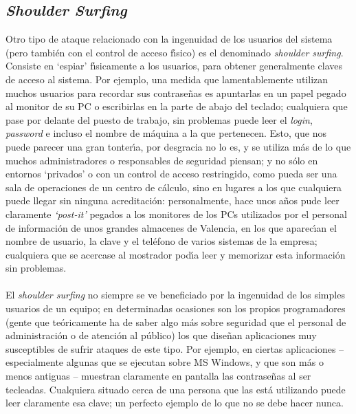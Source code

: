 \subsection{{\it Shoulder Surfing}} 
Otro tipo de ataque relacionado con la ingenuidad de los usuarios del sistema 
(pero tambi\'en con el control de acceso f\'{\i}sico)
es el denominado {\it shoulder surfing}. Consiste en `espiar' f\'{\i}sicamente
a los usuarios, para obtener generalmente claves de acceso al sistema. Por
ejemplo, una medida que lamentablemente utilizan muchos usuarios para recordar
sus contrase\~nas es apuntarlas en un papel pegado al monitor de su PC o 
escribirlas en la parte de abajo del teclado; cualquiera que pase por delante 
del puesto de trabajo, sin problemas puede leer el {\it login}, {\it password}
e incluso el nombre de m\'aquina a la que pertenecen. Esto, que nos puede 
parecer una gran tonter\'{\i}a, por desgracia no lo es, y se utiliza m\'as de
lo que muchos administradores o responsables de seguridad piensan; y no s\'olo
en entornos `privados' o con un control de acceso restringido, como pueda ser
una sala de operaciones de un centro de c\'alculo, sino en lugares a los que
cualquiera puede llegar sin ninguna acreditaci\'on: personalmente, hace unos 
a\~nos pude leer claramente {\it `post-it'} pegados a los monitores de los PCs 
utilizados por el personal de informaci\'on de unos grandes almacenes de 
Valencia, en los que aparec\'{\i}an el nombre de usuario, la clave y el 
tel\'efono de
varios sistemas de la empresa; cualquiera que se acercase al mostrador 
pod\'{\i}a leer y memorizar esta informaci\'on sin problemas.\\
\\El {\it shoulder surfing} no siempre se ve beneficiado por la ingenuidad de 
los simples usuarios de un equipo; en determinadas ocasiones son los propios
programadores (gente que te\'oricamente ha de saber algo m\'as sobre seguridad
que el personal de administraci\'on o de atenci\'on al p\'ublico) los que 
dise\~nan aplicaciones muy susceptibles de sufrir ataques de este tipo. Por
ejemplo, en ciertas aplicaciones -- especialmente algunas que se ejecutan 
sobre MS Windows, y que son m\'as o menos antiguas -- muestran claramente en 
pantalla las contrase\~nas al ser 
tecleadas. Cualquiera situado cerca de una persona que las est\'a utilizando
puede leer claramente esa clave; un perfecto ejemplo de lo que {\sc no} se 
debe hacer nunca.
